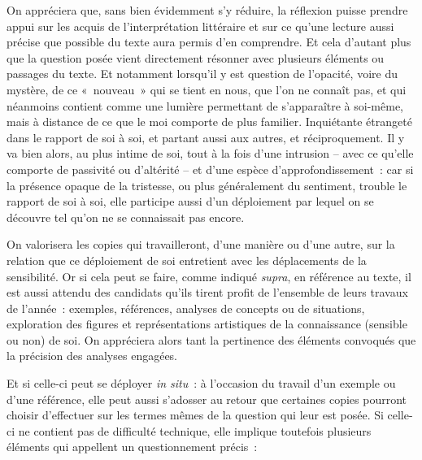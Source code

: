 {On appréciera que, sans bien évidemment s'y réduire, la réflexion puisse
prendre appui sur les acquis de l'interprétation littéraire et sur ce qu'une lecture aussi
précise que possible du texte aura permis d'en comprendre. Et cela d'autant plus que
la question posée vient directement résonner avec plusieurs éléments ou passages
du texte. Et notamment lorsqu'il y est question de l'opacité, voire du mystère, de ce
«~nouveau~» qui se tient en nous, que l'on ne connaît pas, et qui néanmoins contient
comme une lumière permettant de s'apparaître à soi-même, mais à distance de ce que
le moi comporte de plus familier. Inquiétante étrangeté dans le rapport de soi à soi, et
partant aussi aux autres, et réciproquement. Il y va bien alors, au plus intime de soi,
tout à la fois d'une intrusion – avec ce qu'elle comporte de passivité ou d'altérité – et
d'une espèce d'approfondissement~: car si la présence opaque de la tristesse, ou plus
généralement du sentiment, trouble le rapport de soi à soi, elle participe aussi d'un
déploiement par lequel on se découvre tel qu'on ne se connaissait pas encore.

On valorisera les copies qui travailleront, d'une manière ou d'une autre, sur la
relation que ce déploiement de soi entretient avec les déplacements de la sensibilité.
Or si cela peut se faire, comme indiqué \textit{supra}, en référence au texte, il est aussi
attendu des candidats qu'ils tirent profit de l'ensemble de leurs travaux de l'année~:
exemples, références, analyses de concepts ou de situations, exploration des figures
et représentations artistiques de la connaissance (sensible ou non) de soi. On
appréciera alors tant la pertinence des éléments convoqués que la précision des
analyses engagées.

Et si celle-ci peut se déployer \textit{in situ}~: à l'occasion du travail d'un exemple ou
d'une référence, elle peut aussi s'adosser au retour que certaines copies pourront
choisir d'effectuer sur les termes mêmes de la question qui leur est posée. Si celle-ci
ne contient pas de difficulté technique, elle implique toutefois plusieurs éléments qui
appellent un questionnement précis~:

}
